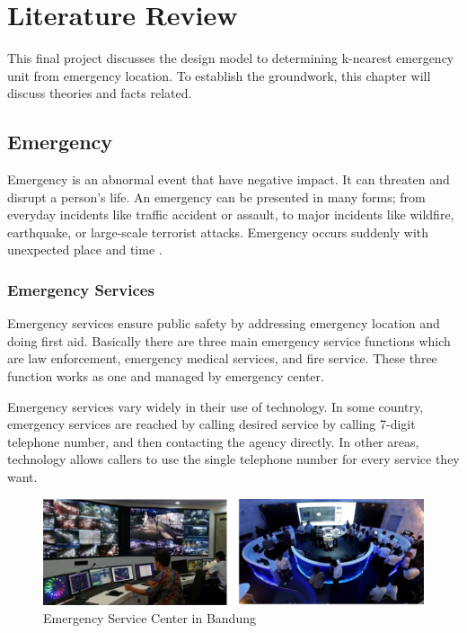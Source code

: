 \chapter{Literature Review}
This final project discusses the design model to determining k-nearest emergency unit from emergency location. To establish the groundwork, this chapter will discuss theories and facts related.

\section{Emergency}
Emergency is an abnormal event that have negative impact. It can threaten and disrupt a person's life. An emergency can be presented in many forms; from everyday incidents like traffic accident or assault, to major incidents like wildfire, earthquake, or large-scale terrorist attacks. Emergency occurs suddenly with unexpected place and time \cite{hauke2011}.

\subsection{Emergency Services}

Emergency services ensure public safety by addressing emergency location and doing first aid. Basically there are three main emergency service functions which are law enforcement, emergency medical services, and fire service. These three function works as one and managed by emergency center. 

Emergency services vary widely in their use of technology. In some country, emergency services are reached by calling desired service by calling 7-digit telephone number, and then contacting the agency directly. In other areas, technology allows callers to use the single telephone number for every service they want.


\begin{figure}[H]
    \centering
    \includegraphics[scale=0.7]{emergency_center.png}
    \caption{Emergency Service Center in Bandung}
    \label{fig:emergency-units}
\end{figure}


